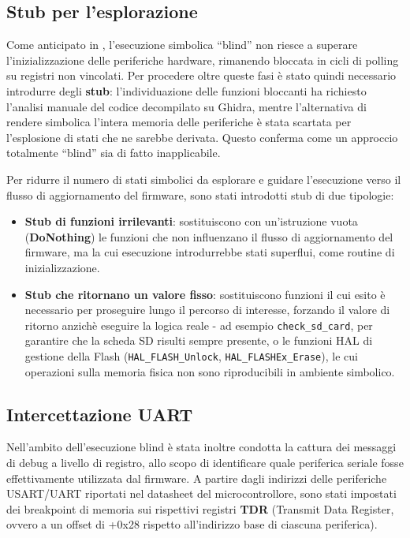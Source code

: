 \subsection{Stub per l'esplorazione}
\label{subsec:stub_angr_esplorazione}

Come anticipato in , l'esecuzione 
simbolica ``blind'' non riesce a superare l'inizializzazione delle 
periferiche hardware, rimanendo bloccata in cicli di polling su registri 
non vincolati. Per procedere oltre queste fasi è stato quindi necessario 
introdurre degli \textbf{stub}: l'individuazione delle funzioni bloccanti 
ha richiesto l'analisi manuale del codice decompilato su Ghidra, mentre 
l'alternativa di rendere simbolica l'intera memoria delle periferiche è 
stata scartata per l'esplosione di stati che ne sarebbe derivata. Questo 
conferma come un approccio totalmente ``blind'' sia di fatto inapplicabile.

Per ridurre il numero di stati simbolici da esplorare e guidare 
l'esecuzione verso il flusso di aggiornamento del firmware, sono stati 
introdotti stub di due tipologie:
\begin{itemize}
    \item \textbf{Stub di funzioni irrilevanti}: sostituiscono con 
    un'istruzione vuota (\textbf{DoNothing}) le funzioni che non influenzano 
    il flusso di aggiornamento del firmware, ma la cui esecuzione 
    introdurrebbe stati superflui, come routine di inizializzazione.
    \item \textbf{Stub che ritornano un valore fisso}: sostituiscono 
    funzioni il cui esito è necessario per proseguire lungo il percorso di 
    interesse, forzando il valore di ritorno anzichè eseguire la logica 
    reale - ad esempio \texttt{check\_sd\_card}, per garantire che la 
    scheda SD risulti sempre presente, o le funzioni HAL di gestione della 
    Flash (\texttt{HAL\_FLASH\_Unlock}, \texttt{HAL\_FLASHEx\_Erase}), le 
    cui operazioni sulla memoria fisica non sono riproducibili in ambiente 
    simbolico.
\end{itemize}

\subsection{Intercettazione UART}
\label{subsec:intercettazione_uart}

Nell'ambito dell'esecuzione blind è stata inoltre condotta la cattura dei 
messaggi di debug a livello di registro, allo scopo di identificare quale 
periferica seriale fosse effettivamente utilizzata dal firmware. A partire 
dagli indirizzi delle periferiche USART/UART riportati nel datasheet del 
microcontrollore, sono stati impostati dei breakpoint di memoria sui 
rispettivi registri \textbf{TDR} (Transmit Data Register, ovvero a un 
offset di +0x28 rispetto all'indirizzo base di ciascuna periferica).

